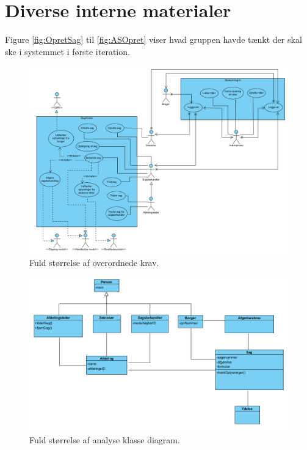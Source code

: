 \section{Diverse interne materialer} \label{sec:diverse}

Figure \ref{fig:OpretSag} til \ref{fig:ASOpret} viser hvad gruppen havde tænkt der skal ske i systemmet i første iteration. \\

\begin{figure}[hbt!]
  \includegraphics[width=\linewidth]{./PNG/krav/fuldoverkrav.PNG} 
  \caption{Fuld størrelse af overordnede krav.}
  \label{fig:fuldoverkrav}
\end{figure}

\begin{figure}[hbt!]
  \includegraphics[width=\linewidth]{./PNG/analyse/fuldanalyseklassediagram.PNG} 
  \caption{Fuld størrelse af analyse klasse diagram.}
  \label{fig:fuldDesignKlasseDiagram}
\end{figure}


